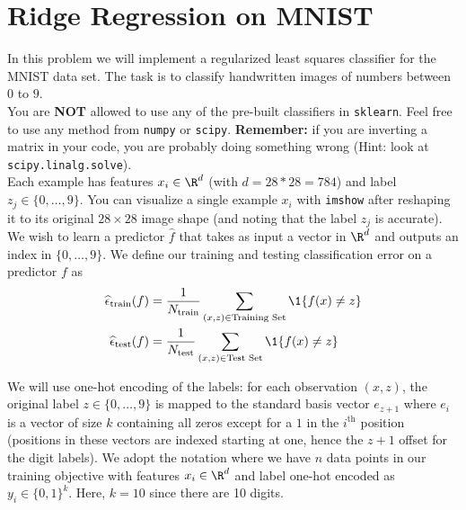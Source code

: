\documentclass{article}
\begin{document}
\section*{Ridge Regression on MNIST}
\begin{aprob}
    In this problem we will implement a regularized least squares classifier for the MNIST data set. The task
    is to classify handwritten images of numbers between $0$ to $9$.\\
    
    You are \textbf{NOT} allowed to use any of the pre-built  classifiers in \verb|sklearn|.  Feel free to use any method from \verb|numpy| or \verb|scipy|. {\bf Remember:} if you are inverting a matrix in your code, you are probably doing something wrong (Hint: look at \verb|scipy.linalg.solve|).\\

    Each example has features $x_i \in \R^d$ (with $d=28*28=784$) and label $z_j \in \{0,\dots,9\}$. You can visualize a single example $x_i$ with \texttt{imshow} after reshaping it to its original $28 \times 28$ image shape (and noting that the label $z_j$ is accurate). We wish to learn a predictor $\widehat{f}$ that takes as input a vector in $\R^d$ and outputs an index in $\{0,\dots,9\}$. We define our training and testing classification error on a predictor $f$ as
    \begin{align*}
        \widehat{\epsilon}_{\textrm{train}}(f) &=
        \frac{1}{N _{\textrm{train}}} \sum_{(x,z)\in \textrm{Training Set}}     \1\{ f(x) \neq z \}
        \\
          \widehat{\epsilon}_{\textrm{test}}(f) &=
          \frac{1}{N _{\textrm{test}}} \sum_{(x,z)\in \textrm{Test Set}}     \1\{ f(x) \neq z \} 
    \end{align*}
    
    We will use one-hot encoding of the labels: for each observation $(x,z)$, the original label $z \in \{0, \ldots, 9\}$ is mapped to the standard basis vector $e_{z+1}$ where $e_i$ is a vector of size $k$ containing all zeros except for a $1$ in the $i^{\textrm{th}}$ position (positions in these vectors are indexed starting at one, hence the $z+1$ offset for the digit labels). We adopt the notation where we have $n$ data points in our training objective with features $x_i \in \R^d$ and label one-hot encoded as $y_i \in \{0,1\}^k$. Here, $k=10$ since there are 10 digits.
    

\end{aprob}
\end{document}

